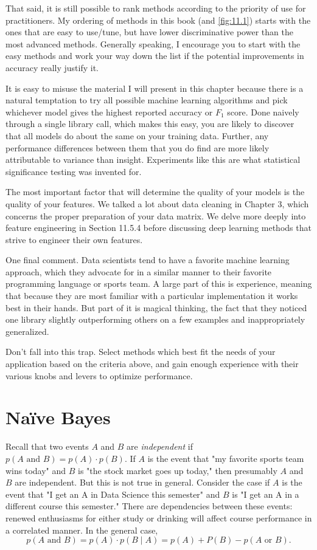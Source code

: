 \documentclass[10pt]{article}
\begin{document}
\begin{enumerate}
That said, it is still possible to rank methods according to the priority of use for practitioners. My ordering of methods in this book (and \autoref{fig:11.1}) starts with the ones that are easy to use/tune, but have lower discriminative power than the most advanced methods. Generally speaking, I encourage you to start with the easy methods and work your way down the list if the potential improvements in accuracy really justify it.

It is easy to misuse the material I will present in this chapter because there is a natural temptation to try all possible machine learning algorithms and pick whichever model gives the highest reported accuracy or $F_1$ score. Done naively through a single library call, which makes this easy, you are likely to discover that all models do about the same on your training data. Further, any performance differences between them that you do find are more likely attributable to variance than insight. Experiments like this are what statistical significance testing was invented for.

The most important factor that will determine the quality of your models is the quality of your features. We talked a lot about data cleaning in Chapter 3, which concerns the proper preparation of your data matrix. We delve more deeply into feature engineering in Section 11.5.4 before discussing deep learning methods that strive to engineer their own features.

One final comment. Data scientists tend to have a favorite machine learning approach, which they advocate for in a similar manner to their favorite programming language or sports team. A large part of this is experience, meaning that because they are most familiar with a particular implementation it works best in their hands. But part of it is magical thinking, the fact that they noticed one library slightly outperforming others on a few examples and inappropriately generalized.

Don't fall into this trap. Select methods which best fit the needs of your application based on the criteria above, and gain enough experience with their various knobs and levers to optimize performance.

\section*{Naïve Bayes}
Recall that two events $A$ and $B$ are \textit{independent} if $p(A \text{ and } B) = p(A) \cdot p(B)$. If $A$ is the event that "my favorite sports team wins today" and $B$ is "the stock market goes up today," then presumably $A$ and $B$ are independent. But this is not true in general. Consider the case if $A$ is the event that "I get an A in Data Science this semester" and $B$ is "I get an A in a different course this semester." There are dependencies between these events: renewed enthusiasms for either study or drinking will affect course performance in a correlated manner. In the general case,
\[
p(A \text{ and } B) = p(A) \cdot p(B \mid A) = p(A) + P(B) - p(A \text{ or } B).
\]


\end{enumerate}
\end{document}
